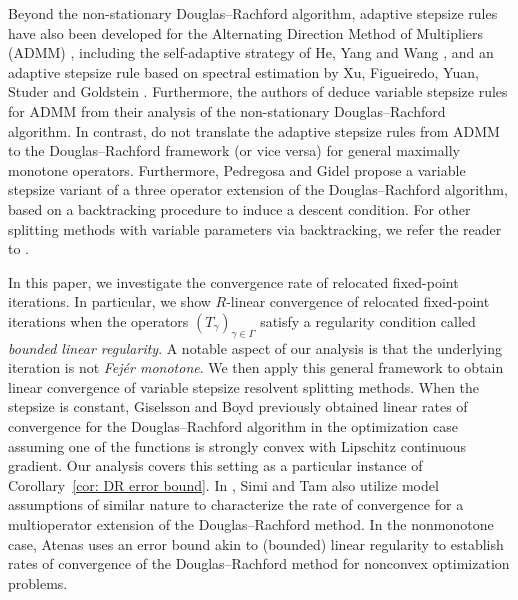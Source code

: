\documentclass[a4paper,12pt]{article}
\begin{document}
Beyond the non-stationary Douglas--Rachford algorithm, adaptive stepsize rules have also been developed for the Alternating Direction Method of Multipliers (ADMM) \cite{gabay1976dual,glowinski1975approximation}, including the self-adaptive strategy of He, Yang and Wang \cite{he2000alternating}, and an adaptive stepsize rule based on spectral estimation by Xu, Figueiredo, Yuan, Studer and Goldstein \cite{xu2017adaptive}. Furthermore, the authors of \cite{lorenz2019non} deduce variable stepsize rules for ADMM from their analysis of the non-stationary Douglas--Rachford algorithm. In contrast, \cite{he2000alternating,xu2017adaptive} do not translate the adaptive stepsize rules from ADMM to the Douglas--Rachford framework (or vice versa) for general maximally monotone operators. Furthermore, Pedregosa and Gidel \cite{pedregosa2018adaptive} propose a variable stepsize variant of a three operator extension of the Douglas--Rachford algorithm, based on a backtracking procedure to induce a descent condition. For other splitting methods with variable parameters via backtracking, we refer the reader to \cite{malitsky2018first,giselsson2016line}.




In this paper, we investigate the convergence rate of relocated fixed-point iterations. In particular, we show $R$-linear convergence of relocated fixed-point iterations when the operators $(T_{\gamma})_{\gamma \in \Gamma}$ satisfy a regularity condition called \emph{bounded linear regularity}. A notable aspect of our analysis is that the underlying iteration is not \emph{Fej\'er monotone}. We then apply this general framework to obtain linear convergence of variable stepsize resolvent splitting methods. When the stepsize is constant, Giselsson and Boyd \cite{giselsson2016linear} previously obtained linear rates of convergence for the Douglas--Rachford algorithm in the optimization case assuming one of the functions is strongly convex with Lipschitz continuous gradient. Our analysis covers this setting as a particular instance of Corollary~\ref{cor: DR error bound}. In \cite{simi2025linear}, Simi and Tam also utilize model assumptions of similar nature to characterize the rate of convergence for a multioperator extension of the Douglas--Rachford method. In the nonmonotone case, Atenas \cite{A25} uses an error bound akin to (bounded) linear regularity to establish rates of convergence of the Douglas--Rachford method for nonconvex optimization problems.  %
\end{document}
